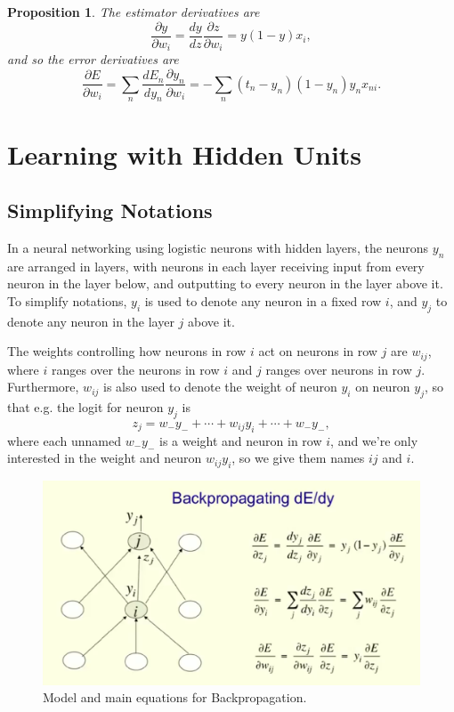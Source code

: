 \documentclass[12pt]{article}
\theoremstyle{plain}
\newtheorem{proposition}[theorem]{Proposition}
\theoremstyle{definition}
\theoremstyle{remark}
\begin{document}
\begin{proposition}
\label{simpleerrorderivatives}
The estimator derivatives are
$$\frac{\partial y}{\partial w_i} = \frac{dy}{dz} \frac{\partial z}{\partial w_i} 
= y(1 - y) x_i,$$ and so the error derivatives are
$$\frac{\partial E}{\partial w_i} = \sum_n \frac{dE_n}{dy_n} \frac{\partial y_n}{\partial w_i} = - \sum_n (t_n - y_n)(1 - y_n) y_n x_{ni}.$$
\end{proposition}

\section{Learning with Hidden Units}

\subsection{Simplifying Notations}

In a neural networking using logistic neurons with hidden layers, the neurons $y_n$ are arranged in layers, with neurons in each layer receiving input from every neuron in the layer below, and outputting to every neuron in the layer above it. To simplify notations, $y_i$ is used to denote any neuron in a fixed row $i$, and $y_j$ to denote any neuron in the layer $j$ above it.

The weights controlling how neurons in row $i$ act on neurons in row $j$ are $w_{ij}$, where $i$ ranges over the neurons in row $i$ and $j$ ranges over neurons in row $j$. Furthermore, $w_{ij}$ is also used to denote the weight of neuron $y_i$ on neuron $y_j$, so that e.g. the logit for neuron $y_j$ is $$z_j = w_{-} y_{-} + \cdots + w_{ij} y_{i} + \cdots + w_{-} y_{-},$$ where each unnamed $w_{-} y_{-}$ is a weight and neuron in row $i$, and we're only interested in the weight and neuron $w_{ij} y_{i}$, so we give them names $ij$ and $i$.

\begin{figure}[H]
\centering
\includegraphics[width=1.0\textwidth]{backprop}
\caption{Model and main equations for Backpropagation.}
\end{figure}
\end{document}
